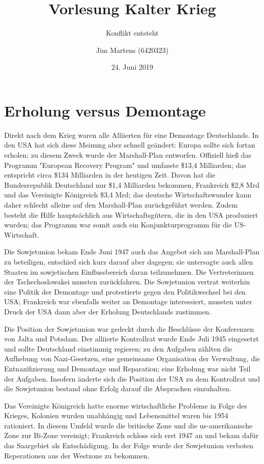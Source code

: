 \documentclass[10pt,a4paper,oneside,ngerman,numbers=noenddot]{scrartcl}
\begin{document}
\author{Jim Martens (6420323)}
\title{Vorlesung Kalter Krieg}
\subtitle{Konflikt entsteht}
\date{24. Juni 2019}
\maketitle

\section{Erholung versus Demontage}

Direkt nach dem Krieg waren alle Alliierten für eine Demontage Deutschlands. In den USA hat sich diese Meinung
aber schnell geändert: Europa sollte sich fortan erholen; zu diesem Zweck wurde der Marshall-Plan entworfen.
Offiziell hieß das Programm "European Recovery Program" und umfasste \$13,4 Milliarden; das entspricht circa \$134 
Milliarden in der heutigen Zeit. Davon hat die Bundesrepublik Deutschland nur \$1,4 Milliarden bekommen, Frankreich 
\$2,8 Mrd und das Vereinigte Königreich \$3,4 Mrd; das deutsche Wirtschaftswunder kann daher schlecht alleine
auf den Marshall-Plan zurückgeführt werden. Zudem besteht die Hilfe hauptsächlich aus Wirtschaftsgütern, die
in den USA produziert wurden; das Programm war somit auch ein Konjunkturprogramm für die US-Wirtschaft.
 
Die Sowjetunion bekam Ende Juni 1947 auch das Angebot sich am Marshall-Plan zu beteiligen, entschied sich kurz
darauf aber dagegen; sie untersagte auch allen Staaten im sowjetischen Einflussbereich daran teilzunehmen. Die
Vertreter\*innen der Tschechoslowakei mussten zurückfahren. Die Sowjetunion vertrat weiterhin eine Politik der
Demontage und protestierte gegen den Politikwechsel bei den USA; Frankreich war ebenfalls weiter an Demontage 
interessiert, mussten unter Druck der USA dann aber der Erholung Deutschlands zustimmen.

Die Position der Sowjetunion war gedeckt durch die Beschlüsse der Konferenzen von Jalta und Potsdam. Der alliierte
Kontrollrat wurde Ende Juli 1945 eingesetzt und sollte Deutschland einstimmig regieren; zu den Aufgaben zählten
die Aufhebung von Nazi-Gesetzen, eine gemeinsame Organisation der Verwaltung, die Entnazifizierung und
Demontage und Reparation; eine Erholung war nicht Teil der Aufgaben. Insofern änderte sich die Position der
USA zu dem Kontrollrat und die Sowjetunion bestand ohne Erfolg darauf die Absprachen einzuhalten. 

Das Vereinigte Königreich hatte enorme wirtschaftliche Probleme in Folge des Krieges, Kolonien wurden unabhängig
und Lebensmittel waren bis 1954 rationiert. In diesem Umfeld wurde die britische Zone und die us-amerikanische 
Zone zur Bi-Zone vereinigt; Frankreich schloss sich erst 1947 an und bekam dafür das Saargebiet als Entschädigung.
In der Folge wurde der Sowjetunion verboten Reperationen aus der Westzone zu bekommen.
\end{document}
